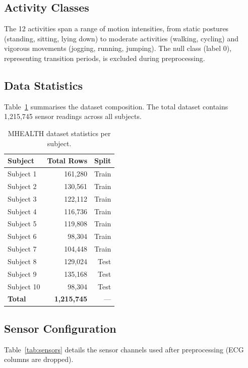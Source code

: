\documentclass[10pt,twocolumn,letterpaper]{article}
\begin{document}
\subsection{Activity Classes}
The 12 activities span a range of motion intensities, from static postures (standing, sitting, lying down) to moderate activities (walking, cycling) and vigorous movements (jogging, running, jumping). The null class (label 0), representing transition periods, is excluded during preprocessing.

\subsection{Data Statistics}
Table~\ref{tab:dataset} summarises the dataset composition. The total dataset contains 1,215,745 sensor readings across all subjects.

\begin{table}[H]
\centering
\caption{MHEALTH dataset statistics per subject.}
\label{tab:dataset}
\small
\begin{tabular}{lrr}
\toprule
\textbf{Subject} & \textbf{Total Rows} & \textbf{Split} \\
\midrule
Subject 1  & 161,280 & Train \\
Subject 2  & 130,561 & Train \\
Subject 3  & 122,112 & Train \\
Subject 4  & 116,736 & Train \\
Subject 5  & 119,808 & Train \\
Subject 6  & 98,304  & Train \\
Subject 7  & 104,448 & Train \\
\midrule
Subject 8  & 129,024 & Test \\
Subject 9  & 135,168 & Test \\
Subject 10 & 98,304  & Test \\
\midrule
\textbf{Total} & \textbf{1,215,745} & --- \\
\bottomrule
\end{tabular}
\end{table}

\subsection{Sensor Configuration}
Table~\ref{tab:sensors} details the sensor channels used after preprocessing (ECG columns are dropped).
\end{document}
